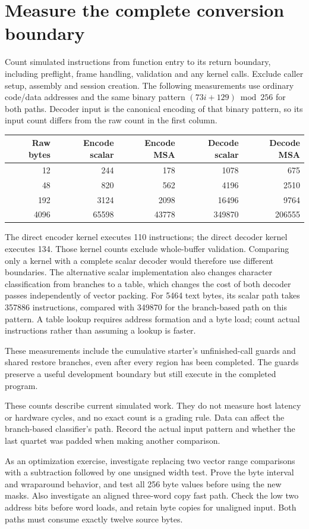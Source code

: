 \section{Measure the complete conversion boundary}
Count simulated instructions from function entry to its return boundary, including
preflight, frame handling, validation and any kernel calls. Exclude caller setup,
assembly and session creation. The following measurements use ordinary code/data addresses and the same binary pattern
\((73i+129)\bmod256\) for both paths. Decoder input is the canonical encoding of that
binary pattern, so its input count differs from the raw count in the first column.
\begin{center}
  \begin{tabular}{rrrrr}
    Raw bytes & Encode scalar & Encode MSA & Decode scalar & Decode MSA \\
    \hline
    12        & 244           & 178        & 1078          & 675        \\
    48        & 820           & 562        & 4196          & 2510       \\
    192       & 3124          & 2098       & 16496         & 9764       \\
    4096      & 65598         & 43778      & 349870        & 206555     \\
  \end{tabular}
\end{center}

The direct encoder kernel executes 110 instructions; the direct decoder kernel executes
134. Those kernel counts exclude whole-buffer validation. Comparing only a kernel with
a complete scalar decoder would therefore use different boundaries. The alternative
scalar implementation also changes character classification from branches to a table,
which changes the cost of both decoder passes independently of vector packing.
For 5464 text bytes, its scalar path takes 357886 instructions, compared with 349870
for the branch-based path on this pattern. A table lookup requires address formation
and a byte load; count actual instructions rather than assuming a lookup is faster.

These measurements include the cumulative starter’s unfinished-call guards and shared
restore branches, even after every region has been completed. The guards preserve a
useful development boundary but still execute in the completed program.

These counts describe current simulated work. They do not measure host latency or
hardware cycles, and no exact count is a grading rule. Data can affect the branch-based
classifier's path. Record the actual input pattern and whether the last quartet was
padded when making another comparison.

As an optimization exercise, investigate replacing two vector range comparisons with
a subtraction followed by one unsigned width test. Prove the byte interval and wraparound
behavior, and test all 256 byte values before using the new masks. Also investigate
an aligned three-word copy fast path. Check the low two address bits before word loads,
and retain byte copies for unaligned input. Both paths must consume exactly twelve
source bytes.
